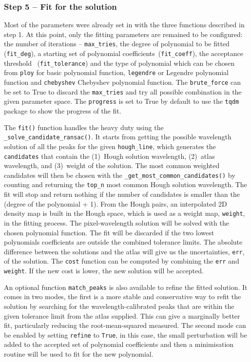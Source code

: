 \documentclass[fleqn,usenatbib]{rasti}
\begin{document}
\subsubsection*{Step 5 -- Fit for the solution}
Most of the parameters were already set in with the three functions described
in step 1. At this point, only the fitting parameters are remained to be
configured: the number of iterations -- \texttt{max\_tries}, the degree of
polynomial to be fitted (\texttt{fit\_deg}), a starting set of polynomial
coefficients~(\texttt{fit\_coeff}), the acceptance threshold~
(\texttt{fit\_tolerance}) and the type of polynomial which can be chosen
from \texttt{ploy} for basic polynomial function, \texttt{legendre} or Legendre
polynomial function and \texttt{chebyshev} Chebyshev polynomial function. The
\texttt{brute\_force} can be set to True to discard the \texttt{max\_tries}
and try all possible combination in the given parameter space. The
\texttt{progress} is set to True by default to use the \texttt{tqdm} package
to show the progress of the fit.

The \texttt{fit()} function handles the heavy duty using the
\texttt{\_solve\_candidate\_ransac()}. It starts from getting the possible
wavelength solution of all the peaks for the given \texttt{hough\_line}, which
generates the \texttt{candidates} that contain the (1)~Hough solution wavelength,
(2)~atlas wavelength, and (3)~weight of the solution. The most common weighted
candidates will then be chosen with the \texttt{\_get\_most\_common\_candidates()}
by counting and returning the \texttt{top\_n} most common Hough solution wavelength.
The fit will stop and return nothing if the number of candidates is smaller than
the (degree of the polynomial + 1). From the Hough pairs, an interpolated 2D
density map is built in the Hough space, which is used as a weight map,
\texttt{weight}, in the fitting process. The pixel-wavelength solution will be
solved with the chosen polynomial function. The fit will be discarded if the two
lowest polynomials coefficients are outside the combined tolerance limits. The
absolute difference between the solutions and the atlas will give us the
uncertainties, \texttt{err}, of the solution. The \texttt{cost} function can
be computed by combining the \texttt{err} and \texttt{weight}. If the new cost
is lower, the new solution will be accepted.

An optional function \texttt{match\_peaks} is also available to refine the
fitted solution. It comes in two modes, the first is a more stable and
conservative way to refit the solution by searching for the wavelength-calibrated
peaks that are within the given tolerance limit from the atlas supplied. This
can give a marginally better fit, particularly reducing the root-mean-squared
measured. The second mode can be enabled by setting \texttt{refine} to
\texttt{True}, in this case, the small perturbation will be added to the accepted
set of polynomial coefficients and then a minimisation routine will be used to
fit for the new polynomial.
\end{document}
